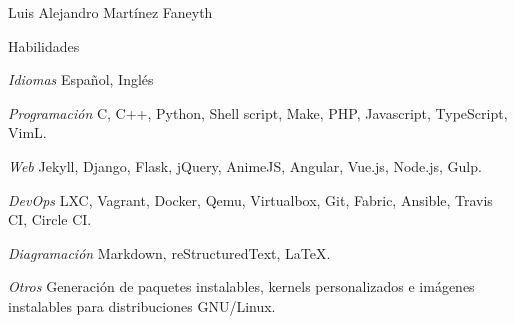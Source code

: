 \documentclass[11pt,letterpaper]{article}
\begin{document}
\begin{cv}{Luis Alejandro Mart\'inez Faneyth}
\begin{cvlist}{Habilidades}
\item[\textit{\large{Idiomas}}]{Espa\~nol, Ingl\'es}
\item[\textit{\large{Programaci\'on}}]{C, C++, Python, Shell script, Make, PHP, Javascript, TypeScript, VimL.}
\item[\textit{\large{Web}}]{Jekyll, Django, Flask, jQuery, AnimeJS, Angular, Vue.js, Node.js, Gulp.}
\item[\textit{\large{DevOps}}]{LXC, Vagrant, Docker, Qemu, Virtualbox, Git, Fabric, Ansible, Travis CI, Circle CI.}
\item[\textit{\large{Diagramaci\'on}}]{Markdown, reStructuredText, \LaTeX.}
\item[\textit{\large{Otros}}]{
	Generaci\'on de paquetes instalables, kernels personalizados e im\'agenes instalables para distribuciones GNU/Linux.\\
}
\end{cvlist}

\end{cv}
\end{document}
